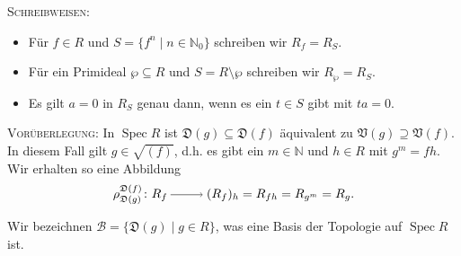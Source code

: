 \documentclass[a4paper,12pt]{scrbook}
\def\V{\mathfrak{V}}
\newcommand{\D}{\mathfrak{D}}
\def\B{\mathcal{B}}
\newcommand{\Spec}{\operatorname{Spec}}
\newcommand{\set}[1]{\ensuremath{\mathbb{#1}}}
\newcommand{\N}{\set{N}}
\newcommand{\ra}{\raisebox{-1pt}{\tikz{\draw[thin,shorten >=3pt, ->] (0,0) node{\hspace*{-2pt}} -- node{} (1,0);}}\penalty1000\relax}
\begin{document}
\textsc{Schreibweisen}:
\begin{itemize}
\item Für $f\in R$ und $S=\{f^n\mid n\in\N_0\}$ schreiben wir $R_f=R_S$.
\item Für ein Primideal $\wp\subseteq R$ und $S=R\setminus\wp$ schreiben wir $R_\wp=R_S$.
\item Es gilt $a=0$ in $R_S$ genau dann, wenn es ein $t\in S$ gibt mit $ta=0$.
\end{itemize}

\textsc{Vorüberlegung}: In $\Spec R$ ist $\D(g)\subseteq \D(f)$ äquivalent zu $\V(g)\supseteq\V(f)$. In diesem Fall gilt
$g\in\sqrt{(f)}$, d.h. es gibt ein $m\in\N$ und $h\in R$ mit $g^m=fh$. Wir erhalten so eine Abbildung
\[ \rho_{\D(g)}^{\D(f)}\colon R_f\ra (R_f)_h=R_{fh}=R_{g^m}=R_g. \]

Wir bezeichnen $\B=\{\D(g)\mid g\in R\}$, was eine Basis der Topologie auf $\Spec R$ ist.
\end{document}
